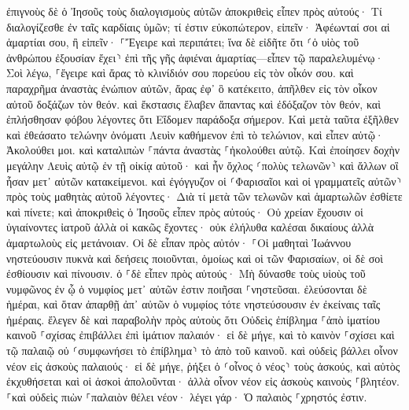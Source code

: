 \documentclass[twoside, 9pt]{extreport}
\begin{document}
ἐπιγνοὺς δὲ ὁ Ἰησοῦς τοὺς διαλογισμοὺς αὐτῶν ἀποκριθεὶς εἶπεν πρὸς αὐτούς· Τί διαλογίζεσθε ἐν ταῖς καρδίαις ὑμῶν; 
τί ἐστιν εὐκοπώτερον, εἰπεῖν· Ἀφέωνταί σοι αἱ ἁμαρτίαι σου, ἢ εἰπεῖν· ⸀Ἔγειρε καὶ περιπάτει; 
ἵνα δὲ εἰδῆτε ὅτι ⸂ὁ υἱὸς τοῦ ἀνθρώπου ἐξουσίαν ἔχει⸃ ἐπὶ τῆς γῆς ἀφιέναι ἁμαρτίας—εἶπεν τῷ παραλελυμένῳ· Σοὶ λέγω, ⸀ἔγειρε καὶ ἄρας τὸ κλινίδιόν σου πορεύου εἰς τὸν οἶκόν σου. 
καὶ παραχρῆμα ἀναστὰς ἐνώπιον αὐτῶν, ἄρας ἐφ᾽ ὃ κατέκειτο, ἀπῆλθεν εἰς τὸν οἶκον αὐτοῦ δοξάζων τὸν θεόν. 
καὶ ἔκστασις ἔλαβεν ἅπαντας καὶ ἐδόξαζον τὸν θεόν, καὶ ἐπλήσθησαν φόβου λέγοντες ὅτι Εἴδομεν παράδοξα σήμερον. 
Καὶ μετὰ ταῦτα ἐξῆλθεν καὶ ἐθεάσατο τελώνην ὀνόματι Λευὶν καθήμενον ἐπὶ τὸ τελώνιον, καὶ εἶπεν αὐτῷ· Ἀκολούθει μοι. 
καὶ καταλιπὼν ⸀πάντα ἀναστὰς ⸀ἠκολούθει αὐτῷ. 
Καὶ ἐποίησεν δοχὴν μεγάλην Λευὶς αὐτῷ ἐν τῇ οἰκίᾳ αὐτοῦ· καὶ ἦν ὄχλος ⸂πολὺς τελωνῶν⸃ καὶ ἄλλων οἳ ἦσαν μετ᾽ αὐτῶν κατακείμενοι. 
καὶ ἐγόγγυζον οἱ ⸂Φαρισαῖοι καὶ οἱ γραμματεῖς αὐτῶν⸃ πρὸς τοὺς μαθητὰς αὐτοῦ λέγοντες· Διὰ τί μετὰ τῶν τελωνῶν καὶ ἁμαρτωλῶν ἐσθίετε καὶ πίνετε; 
καὶ ἀποκριθεὶς ὁ Ἰησοῦς εἶπεν πρὸς αὐτούς· Οὐ χρείαν ἔχουσιν οἱ ὑγιαίνοντες ἰατροῦ ἀλλὰ οἱ κακῶς ἔχοντες· 
οὐκ ἐλήλυθα καλέσαι δικαίους ἀλλὰ ἁμαρτωλοὺς εἰς μετάνοιαν. 
Οἱ δὲ εἶπαν πρὸς αὐτόν· ⸀Οἱ μαθηταὶ Ἰωάννου νηστεύουσιν πυκνὰ καὶ δεήσεις ποιοῦνται, ὁμοίως καὶ οἱ τῶν Φαρισαίων, οἱ δὲ σοὶ ἐσθίουσιν καὶ πίνουσιν. 
ὁ ⸀δὲ εἶπεν πρὸς αὐτούς· Μὴ δύνασθε τοὺς υἱοὺς τοῦ νυμφῶνος ἐν ᾧ ὁ νυμφίος μετ᾽ αὐτῶν ἐστιν ποιῆσαι ⸀νηστεῦσαι. 
ἐλεύσονται δὲ ἡμέραι, καὶ ὅταν ἀπαρθῇ ἀπ᾽ αὐτῶν ὁ νυμφίος τότε νηστεύσουσιν ἐν ἐκείναις ταῖς ἡμέραις. 
ἔλεγεν δὲ καὶ παραβολὴν πρὸς αὐτοὺς ὅτι Οὐδεὶς ἐπίβλημα ⸀ἀπὸ ἱματίου καινοῦ ⸀σχίσας ἐπιβάλλει ἐπὶ ἱμάτιον παλαιόν· εἰ δὲ μήγε, καὶ τὸ καινὸν ⸀σχίσει καὶ τῷ παλαιῷ οὐ ⸂συμφωνήσει τὸ ἐπίβλημα⸃ τὸ ἀπὸ τοῦ καινοῦ. 
καὶ οὐδεὶς βάλλει οἶνον νέον εἰς ἀσκοὺς παλαιούς· εἰ δὲ μήγε, ῥήξει ὁ ⸂οἶνος ὁ νέος⸃ τοὺς ἀσκούς, καὶ αὐτὸς ἐκχυθήσεται καὶ οἱ ἀσκοὶ ἀπολοῦνται· 
ἀλλὰ οἶνον νέον εἰς ἀσκοὺς καινοὺς ⸀βλητέον. 
⸀καὶ οὐδεὶς πιὼν ⸀παλαιὸν θέλει νέον· λέγει γάρ· Ὁ παλαιὸς ⸀χρηστός ἐστιν. 
\end{document}
